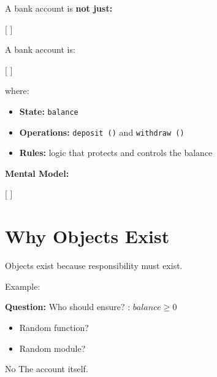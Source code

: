 \documentclass[11pt,a4paper]{book}
\newcommand{\question}[1]{
\vspace{0.5em}
\textbf{Question:} #1?
\vspace{0.2em}
}
\begin{document}










\begin{mentalmodel}

A bank account is \textbf{not just:}

[
]

A bank account is:

[
]

where:

\begin{itemize}
\item \textbf{State:} \texttt{balance}
\item \textbf{Operations:} \texttt{deposit ()} and \texttt{withdraw ()}
\item \textbf{Rules:} logic that protects and controls the balance
\end{itemize}

\textbf{Mental Model:}

[
]

\end{mentalmodel}



\section{Why Objects Exist}

\begin{idea}

Objects exist because responsibility must exist.

\end{idea}

Example:

\question{Who should ensure}: $balance \ge 0$
\begin{itemize}
\item [ ] Random function?
\item [ ] Random module?
\end{itemize}
{\ttfamily\textcolor{RosettaOrange}{No}}
    The account itself.
\end{document}
